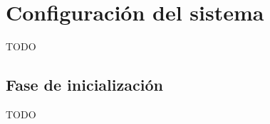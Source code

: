 \documentclass[11pt,spanish,listoffigures,listoftables]{tfgetsinf}
\begin{document}
\APPENDIX


\chapter{Configuración del sistema}

TODO

\section{Fase de inicialización}

TODO




\end{document}
